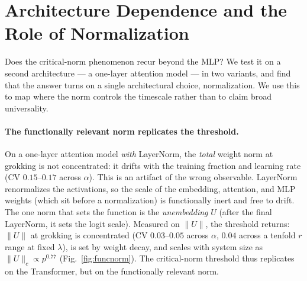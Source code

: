 \documentclass[10pt,twocolumn]{article}
\newcommand{\lam}{\lambda}
\begin{document}
\section{Architecture Dependence and the Role of Normalization}
\label{sec:universal}
Does the critical-norm phenomenon recur beyond the MLP? We test it on a second architecture --- a one-layer
attention model --- in two variants, and find that the answer turns on a single architectural choice,
normalization. We use this to map where the norm controls the timescale rather than to claim broad
universality.

\paragraph{The functionally relevant norm replicates the threshold.}
On a one-layer attention model \emph{with} LayerNorm, the \emph{total} weight norm at grokking is not
concentrated: it drifts with the training fraction and learning rate (CV $0.15$--$0.17$ across $\alpha$).
This is an artifact of the wrong observable. LayerNorm renormalizes the activations, so the scale of the
embedding, attention, and MLP weights (which sit before a normalization) is functionally inert and free to
drift. The one norm that sets the function is the \emph{unembedding} $U$ (after the final LayerNorm, it
sets the logit scale). Measured on $\|U\|$, the threshold returns: $\|U\|$ at grokking is concentrated
(CV $0.03$--$0.05$ across $\alpha$, $0.04$ across a tenfold $r$ range at fixed $\lam$), is set by weight
decay, and scales with system size as $\|U\|_c\propto p^{0.77}$ (Fig.~\ref{fig:funcnorm}). The
critical-norm threshold thus replicates on the Transformer, but on the functionally relevant norm.
\end{document}
